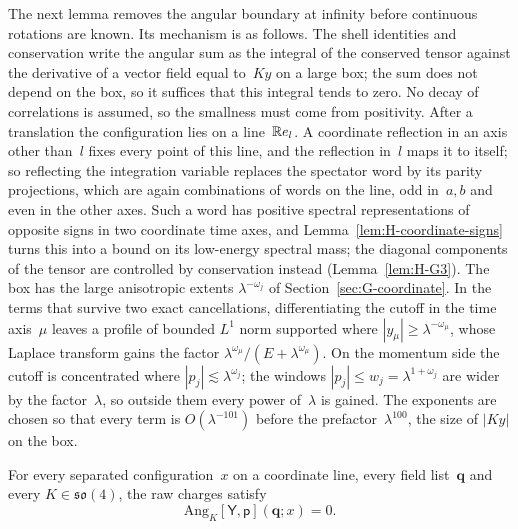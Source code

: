 The next lemma removes the angular boundary at infinity before continuous rotations are known. Its mechanism is as follows. The shell identities and conservation write the angular sum as the integral of the conserved tensor against the derivative of a vector field equal to~$Ky$ on a large box; the sum does not depend on the box, so it suffices that this integral tends to zero. No decay of correlations is assumed, so the smallness must come from positivity. After a translation the configuration lies on a line~$\mathbb{R} e_l$. A coordinate reflection in an axis other than~$l$ fixes every point of this line, and the reflection in~$l$ maps it to itself; so reflecting the integration variable replaces the spectator word by its parity projections, which are again combinations of words on the line, odd in~$a,b$ and even in the other axes. Such a word has positive spectral representations of opposite signs in two coordinate time axes, and Lemma~\ref{lem:H-coordinate-signs} turns this into a bound on its low-energy spectral mass; the diagonal components of the tensor are controlled by conservation instead (Lemma~\ref{lem:H-G3}). The box has the large anisotropic extents $\lambda^{-\omega_j}$ of Section~\ref{sec:G-coordinate}. In the terms that survive two exact cancellations, differentiating the cutoff in the time axis~$\mu$ leaves a profile of bounded $L^1$ norm supported where $|y_\mu|\ge\lambda^{-\omega_\mu}$, whose Laplace transform gains the factor $\lambda^{\omega_\mu}/(E+\lambda^{\omega_\mu})$. On the momentum side the cutoff is concentrated where $|p_j|\lesssim\lambda^{\omega_j}$; the windows $|p_j|\le w_j=\lambda^{1+\omega_j}$ are wider by the factor~$\lambda$, so outside them every power of~$\lambda$ is gained. The exponents are chosen so that every term is $O(\lambda^{-101})$ before the prefactor~$\lambda^{100}$, the size of $|Ky|$ on the box.
\begin{lemma}\label{lem:G-collinear-flux}
For every separated configuration~$x$ on a coordinate line, every field list~$\boldsymbol q$ and every $K\in\mathfrak{so}(4)$, the raw charges satisfy
\begin{equation}\label{eq:G-collinear}
\mathrm{Ang}_K[\mathsf Y,\mathsf p](\boldsymbol q;x)=0.
\end{equation}
\end{lemma}
